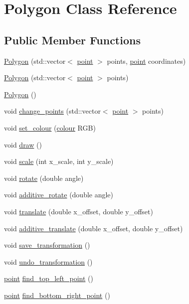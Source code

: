 \hypertarget{class_polygon}{}\section{Polygon Class Reference}
\label{class_polygon}
\subsection*{Public Member Functions}
\begin{DoxyCompactItemize}
\item 
\mbox{\hyperlink{class_polygon_a7c9801ab8183848cda1a9e4e355973cc}{Polygon}} (std\+::vector$<$ \mbox{\hyperlink{structpoint}{point}} $>$ points, \mbox{\hyperlink{structpoint}{point}} coordinates)
\item 
\mbox{\hyperlink{class_polygon_a84c5ba9b7d4fbbfd85e2485712d282d8}{Polygon}} (std\+::vector$<$ \mbox{\hyperlink{structpoint}{point}} $>$ points)
\item 
\mbox{\hyperlink{class_polygon_ac183e712f8be1e13f1c9d5b4d4512ead}{Polygon}} ()
\item 
void \mbox{\hyperlink{class_polygon_ab5a643b45071142291a93070f36e9159}{change\+\_\+points}} (std\+::vector$<$ \mbox{\hyperlink{structpoint}{point}} $>$ points)
\item 
void \mbox{\hyperlink{class_polygon_a5895893a117ad4fba5422e9269ff729c}{set\+\_\+colour}} (\mbox{\hyperlink{structcolour}{colour}} R\+GB)
\item 
void \mbox{\hyperlink{class_polygon_a17428a7d7dff4653c905b91020a9f803}{draw}} ()
\item 
void \mbox{\hyperlink{class_polygon_a3166ec344b0453bde49f6c32300eab12}{scale}} (int x\+\_\+scale, int y\+\_\+scale)
\item 
void \mbox{\hyperlink{class_polygon_ae5993bb89530d873701d9d5558494c09}{rotate}} (double angle)
\item 
void \mbox{\hyperlink{class_polygon_aa058b0c05dcb8a9c4c0f2737ac59fb64}{additive\+\_\+rotate}} (double angle)
\item 
void \mbox{\hyperlink{class_polygon_a8981ae2ebe960a7355134f03dc88f1e3}{translate}} (double x\+\_\+offset, double y\+\_\+offset)
\item 
void \mbox{\hyperlink{class_polygon_aa066ce6c55fe73f2187919085016e9ec}{additive\+\_\+translate}} (double x\+\_\+offset, double y\+\_\+offset)
\item 
void \mbox{\hyperlink{class_polygon_aca723d97ae607e5079cd5dfd7ba616d3}{save\+\_\+transformation}} ()
\item 
void \mbox{\hyperlink{class_polygon_a9c058c0a82c8d8138301d2c6ec049d09}{undo\+\_\+transformation}} ()
\item 
\mbox{\hyperlink{structpoint}{point}} \mbox{\hyperlink{class_polygon_a1c99b0b80833ef2eca19b98530d90910}{find\+\_\+top\+\_\+left\+\_\+point}} ()
\item 
\mbox{\hyperlink{structpoint}{point}} \mbox{\hyperlink{class_polygon_a1f9b4d001197e6ff84fb4ed50b47be59}{find\+\_\+bottom\+\_\+right\+\_\+point}} ()
\end{DoxyCompactItemize}


